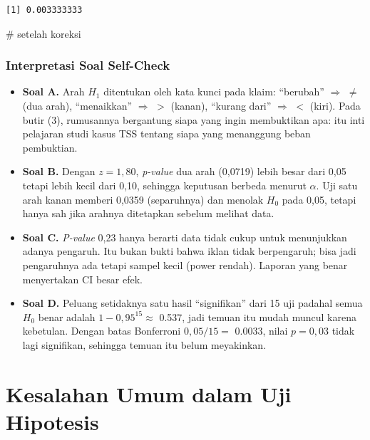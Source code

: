 \documentclass[
  indonesian,
  letterpaper,
]{book}
\newenvironment{Shaded}{\begin{snugshade}}{\end{snugshade}}
\newcommand{\CommentTok}[1]{\textcolor[rgb]{0.37,0.37,0.37}{#1}}
\providecommand{\tightlist}{%
  \setlength{\itemsep}{0pt}\setlength{\parskip}{0pt}}
\begin{document}
\begin{verbatim}
[1] 0.003333333
\end{verbatim}

\begin{Shaded}
\begin{Highlighting}[]
             \CommentTok{\# setelah koreksi}
\end{Highlighting}
\end{Shaded}

\subsection{Interpretasi Soal
Self-Check}\label{interpretasi-soal-self-check}

\begin{itemize}
\tightlist
\item
  \textbf{Soal A.} Arah \(H_1\) ditentukan oleh kata kunci pada klaim:
  ``berubah'' \(\Rightarrow\) \(\neq\) (dua arah), ``menaikkan''
  \(\Rightarrow\) \(>\) (kanan), ``kurang dari'' \(\Rightarrow\) \(<\)
  (kiri). Pada butir (3), rumusannya bergantung siapa yang ingin
  membuktikan apa: itu inti pelajaran studi kasus TSS tentang siapa yang
  menanggung beban pembuktian.
\item
  \textbf{Soal B.} Dengan \(z = 1{,}80\), \emph{p-value} dua arah
  (0,0719) lebih besar dari 0,05 tetapi lebih kecil dari 0,10, sehingga
  keputusan berbeda menurut \(\alpha\). Uji satu arah kanan memberi
  0,0359 (separuhnya) dan menolak \(H_0\) pada 0,05, tetapi hanya sah
  jika arahnya ditetapkan sebelum melihat data.
\item
  \textbf{Soal C.} \emph{P-value} 0,23 hanya berarti data tidak cukup
  untuk menunjukkan adanya pengaruh. Itu bukan bukti bahwa iklan tidak
  berpengaruh; bisa jadi pengaruhnya ada tetapi sampel kecil (power
  rendah). Laporan yang benar menyertakan CI besar efek.
\item
  \textbf{Soal D.} Peluang setidaknya satu hasil ``signifikan'' dari 15
  uji padahal semua \(H_0\) benar adalah \(1 - 0{,}95^{15} \approx\)
  0.537, jadi temuan itu mudah muncul karena kebetulan. Dengan batas
  Bonferroni \(0{,}05/15 =\) 0.0033, nilai \(p = 0{,}03\) tidak lagi
  signifikan, sehingga temuan itu belum meyakinkan.
\end{itemize}


\chapter{Kesalahan Umum dalam Uji
Hipotesis}\label{kesalahan-umum-dalam-uji-hipotesis}
\end{document}
